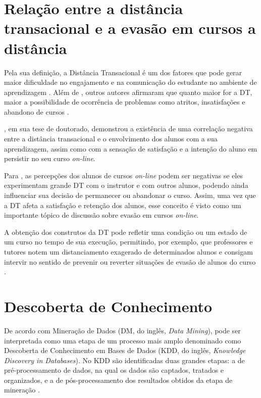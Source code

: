 \section{Relação entre a distância transacional e a evasão em cursos a distância}

Pela sua definição, a Distância Transacional é um dos fatores que pode gerar
maior dificuldade no engajamento e na comunicação do estudante no ambiente de
aprendizagem \cite{goel2012transactional}. Além de
, outros autores afirmaram que quanto
maior for a DT, maior a possibilidade de ocorrência de problemas como atritos,
insatisfações e abandono de cursos
\cite{zhang2003transactional,steinman2007educational,horzum2011developing,
mbwesa2014transactional,paul2015revisiting}.

, em sua tese de doutorado,
demonstrou a existência de uma correlação negativa entre a distância
transacional e o envolvimento dos alunos com a sua aprendizagem, assim como com
a sensação de satisfação e a intenção do aluno em persistir no seu curso
\textit{on-line}.

Para , as percepções dos alunos de cursos
\textit{on-line} podem ser negativas se eles experimentam grande DT com o
instrutor e com outros alunos, podendo ainda influenciar sua decisão de
permanecer ou abandonar o curso. Assim, uma vez que a DT afeta a satisfação e
retenção dos alunos, esse conceito é visto como um importante tópico de
discussão sobre evasão em cursos \textit{on-line}.

A obtenção dos construtos da DT pode refletir uma condição ou um estado de um
curso no tempo de sua execução, permitindo, por exemplo, que professores e
tutores notem um distanciamento exagerado de determinados alunos e consigam
intervir no sentido de prevenir ou reverter situações de evasão de alunos do
curso \cite{horzum2011developing}.

\section{Descoberta de Conhecimento}

De acordo com  Mineração de Dados (DM, do
inglês, \textit{Data Mining}), pode ser interpretada como uma etapa de um
processo mais amplo denominado como Descoberta de Conhecimento em Bases de Dados
(KDD, do inglês, \textit{Knowledge Discovery in Databases}). No KDD são
identificadas duas grandes etapas: a de pré-processamento de dados, na qual os
dados são captados, tratados e organizados, e a de pós-processamento dos
resultados obtidos da etapa de mineração \cite{fayyad1996data}.

